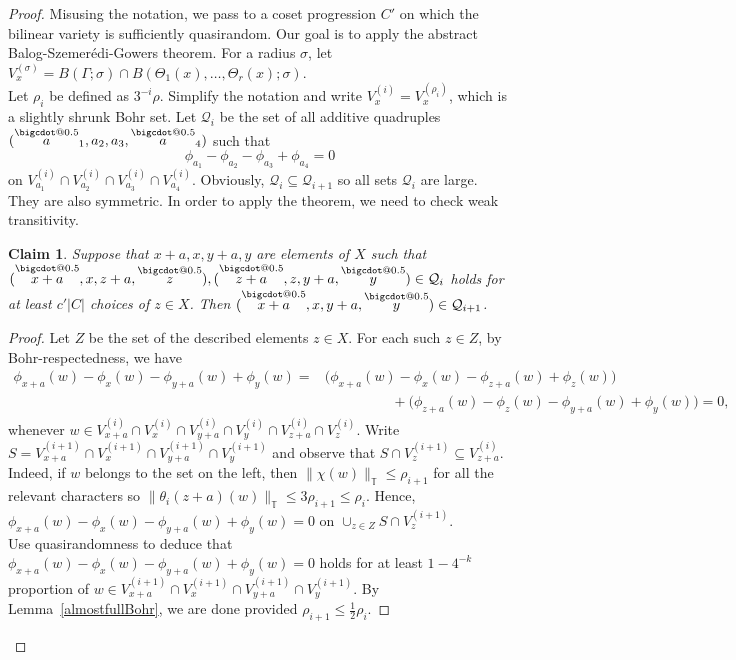 \documentclass[a4paper,11pt]{article}
\makeatletter
\numberwithin{theorem}{section}
\newtheorem{claim}[theorem]{Claim}
\theoremstyle{definition}
\newcommand{\uc}[1]{
    \|#1\|_{\mathbb{T}}
}
\newcommand*\bcdot{\mathpalette\bigcdot@{0.5}}
\newcommand*\bigcdot@[2]{\mathbin{\vcenter{\hbox{\scalebox{#2}{$\m@th#1\bullet$}}}}}
\newcommand{\upd}[1]{\overset{\bcdot}{#1}}
\makeatother
\begin{document}
\begin{proof}
    Misusing the notation, we pass to a coset progression $C'$ on which the bilinear variety is sufficiently quasirandom. Our goal is to apply the abstract Balog-Szemer\'edi-Gowers theorem. For a radius $\sigma$, let $V^{(\sigma)}_x = B(\Gamma; \sigma) \cap B(\Theta_1(x), \dots, \Theta_r(x); \sigma)$.\\
    Let $\rho_i$ be defined as $3^{-i}\rho$. Simplify the notation and write $V^{(i)}_x = V^{(\rho_i)}_x$, which is a slightly shrunk Bohr set. Let $\mathcal{Q}_i$ be the set of all additive quadruples $(\upd a_1, a_2, a_3, \upd a_4)$ such that 
    \[\phi_{a_1} - \phi_{a_2} - \phi_{a_3} + \phi_{a_4} = 0\]
    on $V^{(i)}_{a_1} \cap V^{(i)}_{a_2} \cap V^{(i)}_{a_3} \cap V^{(i)}_{a_4}$. Obviously, $\mathcal{Q}_i \subseteq \mathcal{Q}_{i + 1}$ so all sets $\mathcal{Q}_i$ are large. They are also symmetric. In order to apply the theorem, we need to check weak transitivity.

    \begin{claim}
        Suppose that $x + a, x, y + a, y$ are elements of $X$ such that $(\upd{x + a}, x, z + a, \upd z), (\upd{z + a}, z, y + a, \upd y) \in \mathcal{Q}_i$ holds for at least $c' |C|$ choices of $z \in X$. Then $(\upd{x+a}, x, y + a, \upd{y}) \in \mathcal{Q}_{i+1}$.
    \end{claim}

    \begin{proof} Let $Z$ be the set of the described elements $z \in X$. For each such $z \in Z$, by Bohr-respectedness, we have
    \begin{align*}\phi_{x + a}(w) - \phi_{x}(w) - \phi_{y + a}(w) + \phi_{y}(w) = &\Big(\phi_{x + a}(w) - \phi_{x}(w) - \phi_{z + a}(w) + \phi_{z}(w)\Big) \\
    &\hspace{2cm}+ \Big(\phi_{z + a}(w) - \phi_{z}(w) - \phi_{y + a}(w) + \phi_{y}(w)\Big) = 0,\end{align*}
    whenever $w \in V^{(i)}_{x + a} \cap V^{(i)}_x \cap V^{(i)}_{y + a} \cap V^{(i)}_y \cap V^{(i)}_{z + a} \cap V^{(i)}_z$. Write $S = V^{(i + 1)}_{x + a} \cap V^{(i + 1)}_x \cap V^{(i + 1)}_{y + a} \cap V^{(i + 1)}_y$ and observe that $S \cap V^{(i + 1)}_z \subseteq V^{(i)}_{z + a}$. Indeed, if $w$ belongs to the set on the left, then $\uc{\chi(w)} \leq \rho_{i+1}$ for all the relevant characters so $\uc{\theta_i(z + a)(w)} \leq 3\rho_{i + 1} \leq \rho_i$. Hence, $\phi_{x + a}(w) - \phi_{x}(w) - \phi_{y + a}(w) + \phi_{y}(w) = 0$ on $\cup_{z \in Z} S \cap V^{(i + 1)}_z$.\\
    \indent Use quasirandomness to deduce that $\phi_{x + a}(w) - \phi_{x}(w) - \phi_{y + a}(w) + \phi_{y}(w) = 0$ holds for at least $1 - 4^{-k}$ proportion of $w \in V^{(i + 1)}_{x+a} \cap V^{(i + 1)}_x \cap V^{(i + 1)}_{y + a} \cap V^{(i + 1)}_y$. By Lemma~\ref{almostfullBohr}, we are done provided $\rho_{i + 1} \leq \frac{1}{2}\rho_i$.
    \end{proof}


\end{proof}
\end{document}
